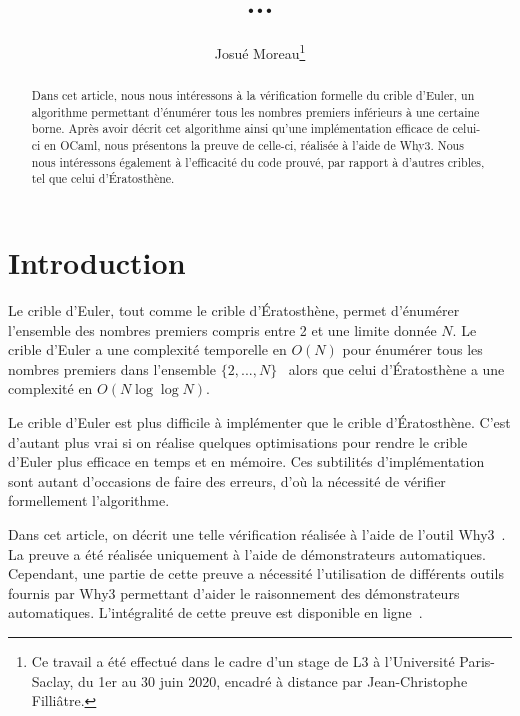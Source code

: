 \documentclass[a4paper]{easychair}
\begin{document}
\title{...}
\author{Josué Moreau\thanks{Ce travail a été effectué dans le cadre
    d'un stage de L3 à l'Université Paris-Saclay, du 1er au 30 juin
    2020, encadré à distance par Jean-Christophe Filliâtre.}}
\maketitle

\begin{abstract}
  Dans cet article, nous nous intéressons à la vérification formelle du
  crible d'Euler, un algorithme permettant d'énumérer tous les nombres
  premiers inférieurs à une certaine borne. Après avoir décrit cet
  algorithme ainsi qu'une implémentation efficace de celui-ci en OCaml,
  nous présentons la preuve de celle-ci, réalisée à l'aide de Why3.
  Nous nous intéressons également à l'efficacité du code prouvé, par
  rapport à d'autres cribles, tel que celui d'Ératosthène.
\end{abstract}

\section{Introduction}

Le crible d'Euler, tout comme le crible d'Ératosthène, permet d'énumérer
l'ensemble des nombres premiers compris entre 2 et une limite donnée $N$.
Le crible d'Euler a une complexité temporelle en $O(N)$ pour énumérer tous les
nombres premiers dans l'ensemble $\{2,...,N\}$~\cite{crible-euler} alors que
celui d'Ératosthène a une complexité en $O(N \log\log N)$.

Le crible d'Euler est plus difficile à implémenter que le crible d'Ératosthène.
C'est d'autant plus vrai si on réalise quelques optimisations pour
rendre le crible d'Euler plus efficace en temps et en mémoire.
Ces subtilités d'implémentation sont autant d'occasions de faire des erreurs,
d'où la nécessité de vérifier formellement l'algorithme.

Dans cet article, on décrit une telle vérification réalisée à l'aide de
l'outil Why3~\cite{why3}.
La preuve a été réalisée uniquement à l'aide de démonstrateurs automatiques.
Cependant, une partie de cette preuve a nécessité l'utilisation de différents
outils fournis par Why3 permettant d'aider le raisonnement des démonstrateurs
automatiques.
L'intégralité de cette preuve est disponible en ligne~\cite{mapreuve}.
\end{document}
